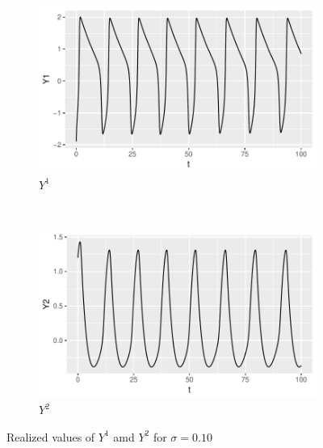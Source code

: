 \documentclass[a4paper]{article}
\begin{document}
\clearpage
\begin{figure}
    \centering
    \begin{subfigure}[b]{0.45\textwidth}
        \includegraphics[width=\textwidth]{part1a-sigma1-Y1.pdf}
        \caption{$Y^1$}
    \end{subfigure}
    ~
    \begin{subfigure}[b]{0.45\textwidth}
        \includegraphics[width=\textwidth]{part1a-sigma1-Y2.pdf}
        \caption{$Y^2$}
    \end{subfigure}
    \caption{Realized values of $Y^1$ amd $Y^2$ for $\sigma = 0.10$}\label{fig:part1a-sigma1}
\end{figure}
\end{document}
